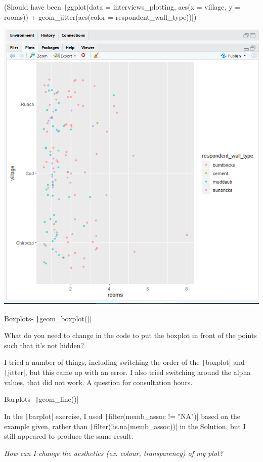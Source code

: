 \documentclass{article}
\begin{document}
(Should have been \texttt|ggplot(data = interviews_plotting, aes(x = village, y = rooms)) + geom_jitter(aes(color = respondent_wall_type))|)

\includegraphics[width=1.0\textwidth]{rstudio_26.PNG}

Boxplots- \texttt|geom_boxplot()|

{\item What do you need to change in the code to put the boxplot in front of the points such that it’s not hidden?
\item I tried a number of things, including switching the order of the \texttt|boxplot| and \texttt|jitter|, but this came up with an error. I also tried switching around the alpha values, that did not work. A question for consultation hours.}

Barplots- \texttt|geom_line()|

In the \texttt|barplot| exercise, I used \texttt|filter(memb_assoc != "NA")| based on the example given, rather than \texttt|filter(!is.na(memb_assoc))| in the Solution, but I still appeared to produce the same result.

\textit{How can I change the aesthetics (ex. colour, transparency) of my plot?}
\end{document}
